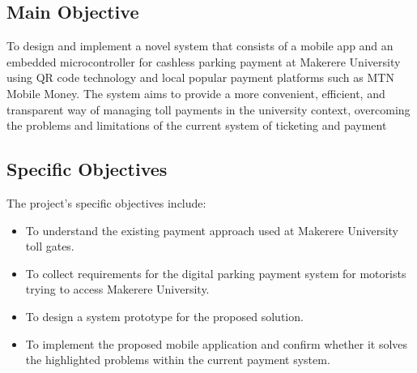 \subsection{Main Objective}
To design and implement a novel system that consists of a mobile app and an embedded microcontroller for cashless parking payment at Makerere University using QR code technology and local popular payment platforms such as MTN Mobile Money. The system aims to provide a more convenient, efficient, and transparent way of managing toll payments in the university context, overcoming the problems and limitations of the current system of ticketing and payment

\subsection{Specific Objectives}
The project's specific objectives include:
\begin{itemize}
    \item To understand the existing payment approach used at Makerere University toll gates.
    \item To collect requirements for the digital parking payment system for motorists trying to access Makerere University.
    \item To design a system prototype for the proposed solution.
    \item To implement the proposed mobile application and confirm whether it solves the highlighted problems within the current payment system.
\end{itemize}
